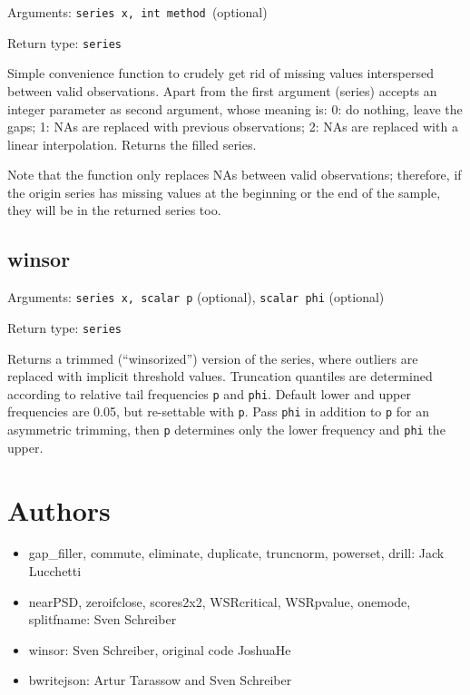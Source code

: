 \documentclass[11pt,english]{article}
\begin{document}
Arguments: \texttt{series x, int method }(optional)\texttt{ }

\noindent Return type: \texttt{series}

Simple convenience function to crudely get rid of missing values
interspersed between valid observations. Apart from the first argument
(series) accepts an integer parameter as second argument, whose
meaning is: 0: do nothing, leave the gaps; 1: NAs are replaced with
previous observations; 2: NAs are replaced with a linear
interpolation. Returns the filled series.

Note that the function only replaces NAs between valid observations;
therefore, if the origin series has missing values at the beginning or
the end of the sample, they will be in the returned series too.

\subsection{winsor}

Arguments: \texttt{series x, scalar p} (optional), \texttt{scalar
phi} (optional) 

\noindent Return type: \texttt{series}

Returns a trimmed (``winsorized'') version
of the series, where outliers are replaced with implicit threshold
values. Truncation quantiles are determined according to relative
tail frequencies \texttt{p} and \texttt{phi}. Default lower and upper
frequencies are 0.05, but re-settable with \texttt{p}. Pass \texttt{phi}
in addition to \texttt{p} for an asymmetric trimming, then \texttt{p}
determines only the lower frequency and \texttt{phi} the upper. 

\section{Authors}
\begin{itemize}
\item gap\_filler, commute, eliminate, duplicate, truncnorm, powerset, drill:
 Jack Lucchetti

\item nearPSD, zeroifclose, scores2x2, WSRcritical, WSRpvalue, onemode,
splitfname:
Sven Schreiber 

\item winsor: Sven Schreiber, original code JoshuaHe
\item bwritejson: Artur Tarassow and Sven Schreiber

\end{itemize}
\end{document}

